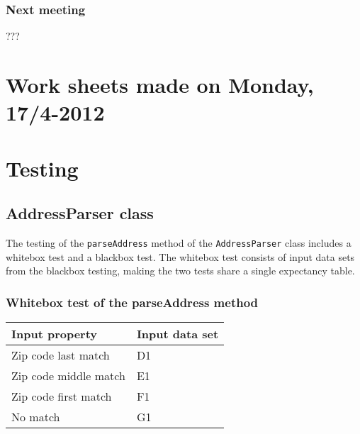 \documentclass[a4paper,11pt]{article}
\begin{document}
\subsubsection*{Next meeting}
???

\pagebreak
\section{Work sheets made on Monday, 17/4-2012}


\pagebreak
\section{Testing}

\subsection{AddressParser class}
The testing of the \texttt{parseAddress} method of the \texttt{AddressParser} class includes a whitebox test and a blackbox test. The whitebox test consists of input data sets from the blackbox testing, making the two tests share a single expectancy table.

\subsubsection{Whitebox test of the parseAddress method}
\begin{tabular}{ p{7cm} | p{4cm}}
	\textbf{Input property} & \textbf{Input data set} \\
	\hline
	Zip code last match & D1 \\
	Zip code middle match & E1 \\
	Zip code first match & F1 \\
	No match & G1
\end{tabular}
\end{document}
